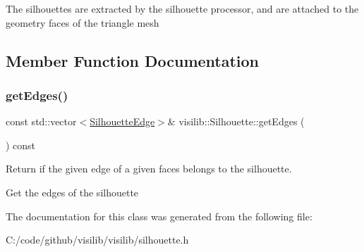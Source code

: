 The silhouettes are extracted by the silhouette processor, and are attached to the geometry faces of the triangle mesh 

\subsection{Member Function Documentation}
\mbox{\label{classvisilib_1_1_silhouette_a71ef8585c5f017de2a5af97d870b12c7}} 
\subsubsection{\texorpdfstring{getEdges()}{getEdges()}}
{\footnotesize\ttfamily const std\+::vector$<$\mbox{\hyperlink{structvisilib_1_1_silhouette_edge}{Silhouette\+Edge}}$>$\& visilib\+::\+Silhouette\+::get\+Edges (\begin{DoxyParamCaption}{ }\end{DoxyParamCaption}) const\hspace{0.3cm}{\ttfamily [inline]}}



Return if the given edge of a given faces belongs to the silhouette. 

Get the edges of the silhouette 

The documentation for this class was generated from the following file\+:\begin{DoxyCompactItemize}
\item 
C\+:/code/github/visilib/visilib/silhouette.\+h\end{DoxyCompactItemize}
